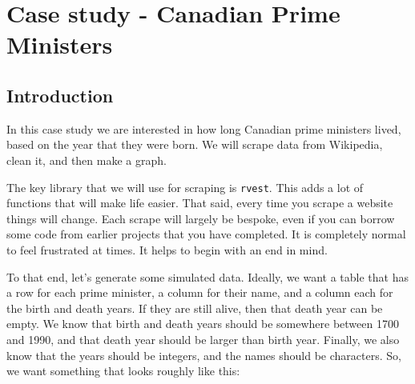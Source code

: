 \documentclass[
]{book}
\begin{document}
\hypertarget{case-study---canadian-prime-ministers}{%
\section{Case study - Canadian Prime Ministers}\label{case-study---canadian-prime-ministers}}

\hypertarget{introduction-10}{%
\subsection{Introduction}\label{introduction-10}}

In this case study we are interested in how long Canadian prime ministers lived, based on the year that they were born. We will scrape data from Wikipedia, clean it, and then make a graph.

The key library that we will use for scraping is \texttt{rvest}. This adds a lot of functions that will make life easier. That said, every time you scrape a website things will change. Each scrape will largely be bespoke, even if you can borrow some code from earlier projects that you have completed. It is completely normal to feel frustrated at times. It helps to begin with an end in mind.

To that end, let's generate some simulated data. Ideally, we want a table that has a row for each prime minister, a column for their name, and a column each for the birth and death years. If they are still alive, then that death year can be empty. We know that birth and death years should be somewhere between 1700 and 1990, and that death year should be larger than birth year. Finally, we also know that the years should be integers, and the names should be characters. So, we want something that looks roughly like this:
\end{document}
